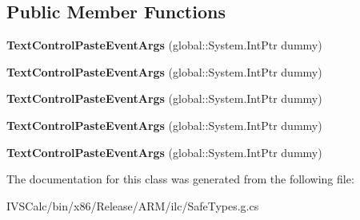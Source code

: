 \subsection*{Public Member Functions}
\begin{DoxyCompactItemize}
\item 
\mbox{\label{class_windows_1_1_u_i_1_1_xaml_1_1_controls_1_1_text_control_paste_event_args_a11760cef8164c955aca24d2898e5d763}} 
{\bfseries Text\+Control\+Paste\+Event\+Args} (global\+::\+System.\+Int\+Ptr dummy)
\item 
\mbox{\label{class_windows_1_1_u_i_1_1_xaml_1_1_controls_1_1_text_control_paste_event_args_a11760cef8164c955aca24d2898e5d763}} 
{\bfseries Text\+Control\+Paste\+Event\+Args} (global\+::\+System.\+Int\+Ptr dummy)
\item 
\mbox{\label{class_windows_1_1_u_i_1_1_xaml_1_1_controls_1_1_text_control_paste_event_args_a11760cef8164c955aca24d2898e5d763}} 
{\bfseries Text\+Control\+Paste\+Event\+Args} (global\+::\+System.\+Int\+Ptr dummy)
\item 
\mbox{\label{class_windows_1_1_u_i_1_1_xaml_1_1_controls_1_1_text_control_paste_event_args_a11760cef8164c955aca24d2898e5d763}} 
{\bfseries Text\+Control\+Paste\+Event\+Args} (global\+::\+System.\+Int\+Ptr dummy)
\item 
\mbox{\label{class_windows_1_1_u_i_1_1_xaml_1_1_controls_1_1_text_control_paste_event_args_a11760cef8164c955aca24d2898e5d763}} 
{\bfseries Text\+Control\+Paste\+Event\+Args} (global\+::\+System.\+Int\+Ptr dummy)
\end{DoxyCompactItemize}


The documentation for this class was generated from the following file\+:\begin{DoxyCompactItemize}
\item 
I\+V\+S\+Calc/bin/x86/\+Release/\+A\+R\+M/ilc/Safe\+Types.\+g.\+cs\end{DoxyCompactItemize}
